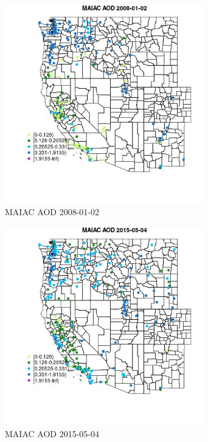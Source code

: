 \begin{figure} 
\centering  
\includegraphics[width=0.77\textwidth]{Code_Outputs/Report_ML_input_PM25_Step4_part_e_de_duplicated_aves_compiled_2019-05-18wNAs_MapObsMAIAC_AOD2008-01-02.jpg} 
\caption{\label{fig:Report_ML_input_PM25_Step4_part_e_de_duplicated_aves_compiled_2019-05-18wNAsMapObsMAIAC_AOD2008-01-02}MAIAC AOD 2008-01-02} 
\end{figure} 
 

\begin{figure} 
\centering  
\includegraphics[width=0.77\textwidth]{Code_Outputs/Report_ML_input_PM25_Step4_part_e_de_duplicated_aves_compiled_2019-05-18wNAs_MapObsMAIAC_AOD2015-05-04.jpg} 
\caption{\label{fig:Report_ML_input_PM25_Step4_part_e_de_duplicated_aves_compiled_2019-05-18wNAsMapObsMAIAC_AOD2015-05-04}MAIAC AOD 2015-05-04} 
\end{figure} 
 

